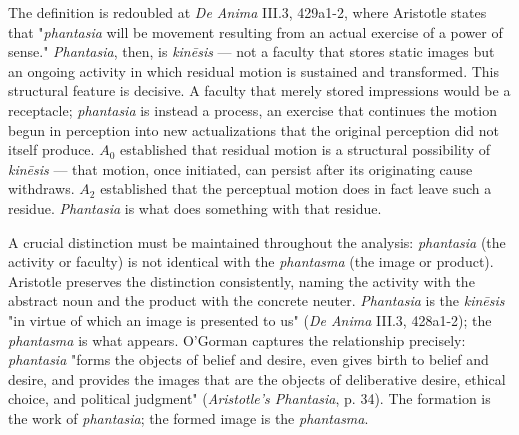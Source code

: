 \documentclass[12pt]{article}
\begin{document}
The definition is redoubled at \textit{De Anima} III.3, 429a1-2, where Aristotle states that "\textit{phantasia} will be movement resulting from an actual exercise of a power of sense." \textit{Phantasia}, then, is \textit{kinēsis} --- not a faculty that stores static images but an ongoing activity in which residual motion is sustained and transformed. This structural feature is decisive. A faculty that merely stored impressions would be a receptacle; \textit{phantasia} is instead a process, an exercise that continues the motion begun in perception into new actualizations that the original perception did not itself produce. $A_0$ established that residual motion is a structural possibility of \textit{kinēsis} --- that motion, once initiated, can persist after its originating cause withdraws. $A_2$ established that the perceptual motion does in fact leave such a residue. \textit{Phantasia} is what does something with that residue.

A crucial distinction must be maintained throughout the analysis: \textit{phantasia} (the activity or faculty) is not identical with the \textit{phantasma} (the image or product). Aristotle preserves the distinction consistently, naming the activity with the abstract noun and the product with the concrete neuter. \textit{Phantasia} is the \textit{kinēsis} "in virtue of which an image is presented to us" (\textit{De Anima} III.3, 428a1-2); the \textit{phantasma} is what appears. O'Gorman captures the relationship precisely: \textit{phantasia} "forms the objects of belief and desire, even gives birth to belief and desire, and provides the images that are the objects of deliberative desire, ethical choice, and political judgment" (\textit{Aristotle's Phantasia}, p. 34). The formation is the work of \textit{phantasia}; the formed image is the \textit{phantasma}.
\end{document}
